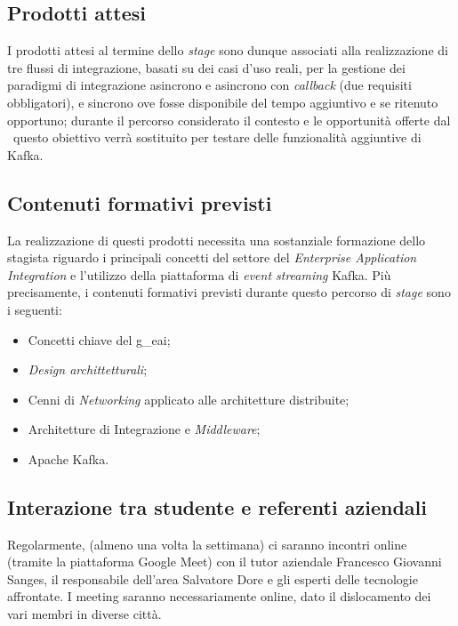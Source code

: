 \subsection{Prodotti attesi}

I prodotti attesi al termine dello \textit{stage} sono dunque associati alla realizzazione di tre flussi di integrazione, basati su dei casi d’uso reali, per la gestione dei paradigmi di integrazione asincrono e asincrono con \textit{callback} (due requisiti obbligatori), e sincrono ove fosse disponibile del tempo aggiuntivo e se ritenuto opportuno; durante il percorso considerato il contesto e le opportunità offerte dal \software\ questo obiettivo verrà sostituito per testare delle funzionalità aggiuntive di Kafka.

\subsection{Contenuti formativi previsti}

La realizzazione di questi prodotti necessita una sostanziale formazione dello stagista riguardo i principali concetti del settore del \textit{Enterprise Application Integration} e l'utilizzo della piattaforma di \textit{event streaming} Kafka.
Più precisamente, i contenuti formativi previsti durante questo percorso di \textit{stage} sono i seguenti:
\begin{itemize}
  \item Concetti chiave del \gls{g_eai};
  \item \textit{Design archittetturali};
  \item Cenni di \textit{Networking} applicato alle architetture distribuite;
  \item Architetture di Integrazione e \textit{Middleware};
  \item Apache Kafka.
\end{itemize}

\subsection{Interazione tra studente e referenti aziendali}
Regolarmente, (almeno una volta la settimana) ci saranno incontri online (tramite la piattaforma Google Meet) con il tutor aziendale Francesco Giovanni Sanges, il responsabile dell’area  Salvatore Dore e gli esperti delle tecnologie affrontate.
I meeting saranno necessariamente online, dato il dislocamento dei vari membri in diverse città.


